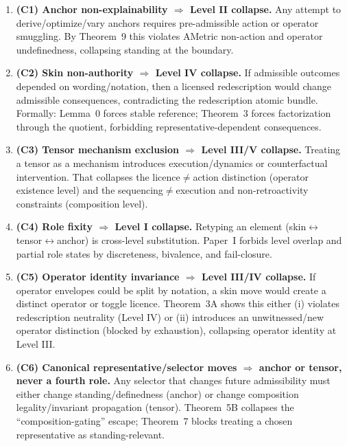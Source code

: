 \documentclass[12pt]{article}
\theoremstyle{plain}
\begin{document}
\begin{enumerate}[leftmargin=*]
\item \textbf{(C1) Anchor non-explainability $\Rightarrow$ Level II collapse.} Any attempt to derive/optimize/vary anchors requires pre-admissible action or operator smuggling. By Theorem~9 this violates AMetric non-action and operator undefinedness, collapsing standing at the boundary.

\item \textbf{(C2) Skin non-authority $\Rightarrow$ Level IV collapse.} If admissible outcomes depended on wording/notation, then a licensed redescription would change admissible consequences, contradicting the redescription atomic bundle. Formally: Lemma~0 forces stable reference; Theorem~3 forces factorization through the quotient, forbidding representative-dependent consequences.

\item \textbf{(C3) Tensor mechanism exclusion $\Rightarrow$ Level III/V collapse.} Treating a tensor as a mechanism introduces execution/dynamics or counterfactual intervention. That collapses the licence$\neq$action distinction (operator existence level) and the sequencing$\neq$execution and non-retroactivity constraints (composition level).

\item \textbf{(C4) Role fixity $\Rightarrow$ Level I collapse.} Retyping an element (skin$\leftrightarrow$tensor$\leftrightarrow$anchor) is cross-level substitution. Paper~I forbids level overlap and partial role states by discreteness, bivalence, and fail-closure.

\item \textbf{(C5) Operator identity invariance $\Rightarrow$ Level III/IV collapse.} If operator envelopes could be split by notation, a skin move would create a distinct operator or toggle licence. Theorem~3A shows this either (i) violates redescription neutrality (Level IV) or (ii) introduces an unwitnessed/new operator distinction (blocked by exhaustion), collapsing operator identity at Level III.

\item \textbf{(C6) Canonical representative/selector moves $\Rightarrow$ anchor or tensor, never a fourth role.} Any selector that changes future admissibility must either change standing/definedness (anchor) or change composition legality/invariant propagation (tensor). Theorem~5B collapses the ``composition-gating'' escape; Theorem~7 blocks treating a chosen representative as standing-relevant.


\end{enumerate}
\end{document}
